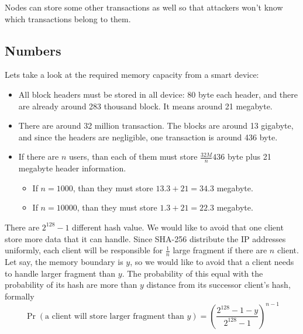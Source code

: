 \documentclass[a4paper,12pt]{article}
\begin{document}
Nodes can store some other transactions as well so that attackers won't know which transactions belong to them.


\subsection{Numbers}


Lets take a look at the required memory capacity from a smart device:
\begin{itemize}
	\item All block headers must be stored in all device: 80 byte each header, and there are already around 283 thousand block. It means around 21 megabyte. 
	\item There are around 32 million transaction. The blocks are around 13 gigabyte, and since the headers are negligible, one transaction is around 436 byte. 
	\item If there are $n$ users, than each of them must store $\frac{32M}{n}436$ byte plus 21 megabyte header information. 
\begin{itemize}
	\item If $n=1000$, than they must store $13.3+21=34.3$ megabyte. 
	\item If $n=10000$, than they must store $1.3+21=22.3$ megabyte. 
\end{itemize}
\end{itemize}

There are $2^{128}-1$ different hash value. We would like to avoid that one client store more data that it can handle. Since SHA-256 distribute the IP addresses uniformly, each client will be responsible for $\frac1n$ large fragment if there are $n$ client. Let say, the memory boundary is $y$, so we would like to avoid that a client needs to handle larger fragment than $y$. The probability of this equal with the probability of its hash are more than $y$ distance from its successor client's hash, formally
$$\Pr(\text{a client will store larger fragment than $y$})=\left(\frac{2^{128}-1-y}{2^{128}-1}\right)^{n-1}$$
\end{document}
